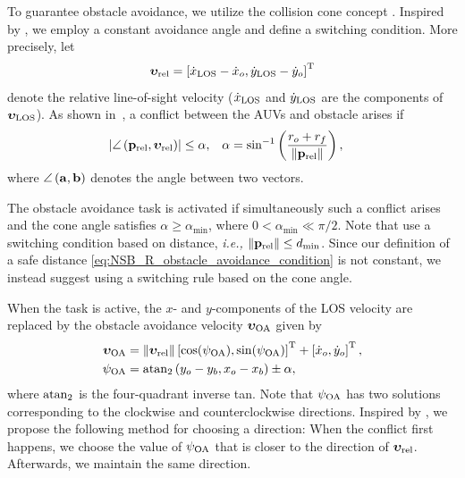 To guarantee obstacle avoidance, we utilize the collision cone concept \cite{chakravarthy_obstacle_1998}. 
Inspired by \cite{wiig_collision_2019}, we employ a constant avoidance angle and define a switching condition.
More precisely, let 
\begin{equation}
    \bm{\upsilon}_{\rm rel} = \left[\dot{x}_{\rm LOS} - \dot{x}_o, \dot{y}_{\rm LOS} - \dot{y}_o\right]^{\mathrm{T}}
\end{equation}
denote the relative line-of-sight velocity ($\dot{x}_{\rm LOS}$ and $\dot{y}_{\rm LOS}$ are the components of $\bm{\upsilon}_{\rm LOS}$).
As shown in~, a conflict between the AUVs and obstacle arises if 
\begin{align}
    \left|\angle\left(\mathbf{p}_{\rm rel}, \bm{\upsilon}_{\rm rel}\right)\right| &\leq \alpha, &
    \alpha &= \sin^{-1}\left(\frac{r_o+r_f}{\left\|\mathbf{p}_{\rm rel}\right\|}\right),
    \label{eq:NSB_R_collision-conflict}
\end{align}
where $\angle\left(\mathbf{a}, \mathbf{b}\right)$ denotes the angle between two vectors.


The obstacle avoidance task is activated if simultaneously such a conflict arises and the cone angle satisfies 
$\alpha \geq \alpha_{\min}$, where $0 < \alpha_{\min} \ll \pi / 2$.
Note that \cite{wiig_collision_2019} use a switching condition based on distance, \emph{i.e.,}
$\left\|\mathbf{p}_{\rm rel}\right\| \leq d_{\min}$.
Since our definition of a safe distance \eqref{eq:NSB_R_obstacle_avoidance_condition} is not constant, we instead suggest using a switching rule based on the cone angle.



When the task is active, the $x$- and $y$-components of the LOS velocity are replaced by the obstacle avoidance velocity $\bm{\upsilon}_{\rm OA}$ given by 
\begin{align}
    \bm{\upsilon}_{\rm OA} &= \left\|\bm{\upsilon}_{\rm rel}\right\| \left[\cos(\psi_{\rm OA}), \sin(\psi_{\rm OA})\right]^{\mathrm{T}} + \left[\dot{x}_o, \dot{y}_o\right]^{\mathrm{T}}, \\
    \psi_{\rm OA} &= {\rm atan}_2 \left(y_o - y_b, x_o - x_b\right) \pm \alpha,
\end{align}
where ${\rm atan}_2$ is the four-quadrant inverse tan.
Note that $\psi_{\rm OA}$ has two solutions corresponding to the clockwise and counterclockwise directions.
Inspired by \cite{haraldsen_reactive_2021}, we propose the following method for choosing a direction:
When the conflict first happens, we choose the value of $\psi_{\rm OA}$ that is closer to the direction of $\bm{\upsilon}_{\rm rel}$.
Afterwards, we maintain the same direction.



